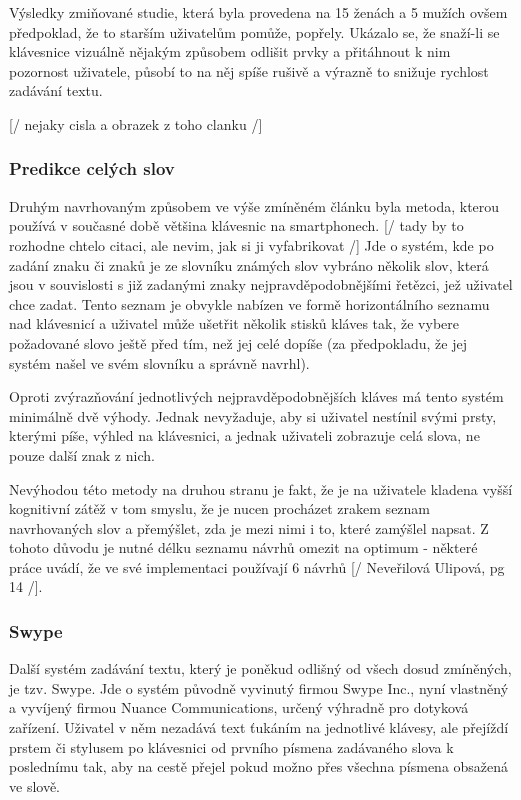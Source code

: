\documentclass{article}
\begin{document}
Výsledky zmiňované studie, která byla provedena na 15 ženách a 5 mužích ovšem předpoklad, že to starším uživatelům pomůže, popřely. Ukázalo se, že snaží-li se klávesnice vizuálně nějakým způsobem odlišit prvky a přitáhnout k nim pozornost uživatele, působí to na něj spíše rušivě a výrazně to snižuje rychlost zadávání textu. 

[/ nejaky cisla a obrazek z toho clanku /]

\subsubsection{Predikce celých slov}

Druhým navrhovaným způsobem ve výše zmíněném článku byla metoda, kterou používá v současné době většina klávesnic na smartphonech. 
[/ tady by to rozhodne chtelo citaci, ale nevim, jak si ji vyfabrikovat /]
Jde o systém, kde po zadání znaku či znaků je ze slovníku známých slov vybráno několik slov, která jsou v souvislosti s již zadanými znaky nejpravděpodobnějšími řetězci, jež uživatel chce zadat. Tento seznam je obvykle nabízen ve formě horizontálního seznamu nad klávesnicí a uživatel může ušetřit několik stisků kláves tak, že vybere požadované slovo ještě před tím, než jej celé dopíše (za předpokladu, že jej systém našel ve svém slovníku a správně navrhl). 

Oproti zvýrazňování jednotlivých nejpravděpodobnějších kláves má tento systém minimálně dvě výhody. Jednak nevyžaduje, aby si uživatel nestínil svými prsty, kterými píše, výhled na klávesnici, a jednak uživateli zobrazuje celá slova, ne pouze další znak z nich. 

Nevýhodou této metody na druhou stranu je fakt, že je na uživatele kladena vyšší kognitivní zátěž v tom smyslu, že je nucen procházet zrakem seznam navrhovaných slov a přemýšlet, zda je mezi nimi i to, které zamýšlel napsat. Z tohoto důvodu je nutné délku seznamu návrhů omezit na optimum - některé práce uvádí, že ve své implementaci používají 6 návrhů [/ Neveřilová Ulipová, pg 14 /]. 

\subsubsection{Swype}

Další systém zadávání textu, který je poněkud odlišný od všech dosud zmíněných, je tzv. Swype. Jde o systém původně vyvinutý firmou Swype Inc., nyní vlastněný a vyvíjený firmou Nuance Communications, určený výhradně pro dotyková zařízení. Uživatel v něm nezadává text ťukáním na jednotlivé klávesy, ale přejíždí prstem či stylusem po klávesnici od prvního písmena zadávaného slova k poslednímu tak, aby na cestě přejel pokud možno přes všechna písmena obsažená ve slově.
\end{document}
